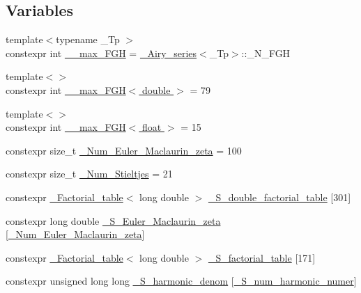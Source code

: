 \subsection*{Variables}
\begin{DoxyCompactItemize}
\item 
{\footnotesize template$<$typename \+\_\+\+Tp $>$ }\\constexpr int \hyperlink{namespacestd_1_1____detail_ae3ef7007b55cd83fa162820c809a2995}{\+\_\+\+\_\+max\+\_\+\+F\+GH} = \hyperlink{classstd_1_1____detail_1_1__Airy__series}{\+\_\+\+Airy\+\_\+series}$<$\+\_\+\+Tp$>$\+::\+\_\+\+N\+\_\+\+F\+GH
\item 
{\footnotesize template$<$$>$ }\\constexpr int \hyperlink{namespacestd_1_1____detail_ac945c3d1897eb356e75d379f67367a4b}{\+\_\+\+\_\+max\+\_\+\+F\+G\+H$<$ double $>$} = 79
\item 
{\footnotesize template$<$$>$ }\\constexpr int \hyperlink{namespacestd_1_1____detail_a67195934ce49105fd7b765e669a5a2a0}{\+\_\+\+\_\+max\+\_\+\+F\+G\+H$<$ float $>$} = 15
\item 
constexpr size\+\_\+t \hyperlink{namespacestd_1_1____detail_ab27e687e1052be7a72de187e0dead124}{\+\_\+\+Num\+\_\+\+Euler\+\_\+\+Maclaurin\+\_\+zeta} = 100
\item 
constexpr size\+\_\+t \hyperlink{namespacestd_1_1____detail_a20c3b4334b0ffa9a5da21768d7830894}{\+\_\+\+Num\+\_\+\+Stieltjes} = 21
\item 
constexpr \hyperlink{structstd_1_1____detail_1_1__Factorial__table}{\+\_\+\+Factorial\+\_\+table}$<$ long double $>$ \hyperlink{namespacestd_1_1____detail_a6d1131fefdb30b2746c76ff801bdc833}{\+\_\+\+S\+\_\+double\+\_\+factorial\+\_\+table} \mbox{[}301\mbox{]}
\item 
constexpr long double \hyperlink{namespacestd_1_1____detail_acd941b49595dd03e93c88107ad2f68c2}{\+\_\+\+S\+\_\+\+Euler\+\_\+\+Maclaurin\+\_\+zeta} \mbox{[}\hyperlink{namespacestd_1_1____detail_ab27e687e1052be7a72de187e0dead124}{\+\_\+\+Num\+\_\+\+Euler\+\_\+\+Maclaurin\+\_\+zeta}\mbox{]}
\item 
constexpr \hyperlink{structstd_1_1____detail_1_1__Factorial__table}{\+\_\+\+Factorial\+\_\+table}$<$ long double $>$ \hyperlink{namespacestd_1_1____detail_a008b54abe31c1027aefdfd7a76a40e99}{\+\_\+\+S\+\_\+factorial\+\_\+table} \mbox{[}171\mbox{]}
\item 
constexpr unsigned long long \hyperlink{namespacestd_1_1____detail_ad2bdb66d93fa4433097b287c7899cd1e}{\+\_\+\+S\+\_\+harmonic\+\_\+denom} \mbox{[}\hyperlink{namespacestd_1_1____detail_a554788747841f6abbfd7572673df32ad}{\+\_\+\+S\+\_\+num\+\_\+harmonic\+\_\+numer}\mbox{]}

\end{DoxyCompactItemize}
